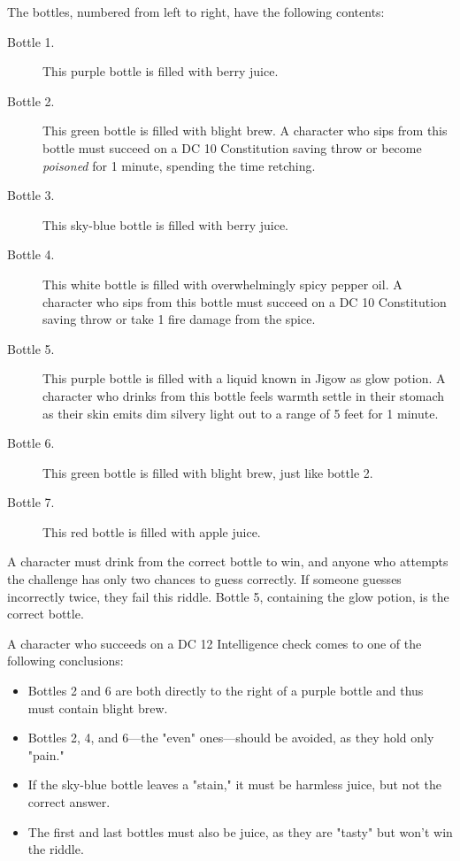 \documentclass[letterpaper, 11pt, bg=full, twocolumn]{dndbook}
\begin{document}
The bottles, numbered from left to right, have the following contents:

\begin{description}
\item[Bottle 1.] This purple bottle is filled with berry juice.
\item[Bottle 2.] This green bottle is filled with blight brew. A character who sips from this bottle must succeed on a DC 10 Constitution saving throw or become \textit{poisoned} for 1 minute, spending the time retching.
\item[Bottle 3.] This sky-blue bottle is filled with berry juice.
\item[Bottle 4.] This white bottle is filled with overwhelmingly spicy pepper oil. A character who sips from this bottle must succeed on a DC 10 Constitution saving throw or take 1 fire damage from the spice.
\item[Bottle 5.] This purple bottle is filled with a liquid known in Jigow as glow potion. A character who drinks from this bottle feels warmth settle in their stomach as their skin emits dim silvery light out to a range of 5 feet for 1 minute.
\item[Bottle 6.] This green bottle is filled with blight brew, just like bottle 2.
\item[Bottle 7.] This red bottle is filled with apple juice.
\end{description}

A character must drink from the correct bottle to win, and anyone who attempts the challenge has only two chances to guess correctly. If someone guesses incorrectly twice, they fail this riddle. Bottle 5, containing the glow potion, is the correct bottle.

A character who succeeds on a DC 12 Intelligence check comes to one of the following conclusions:

\begin{itemize}
\item Bottles 2 and 6 are both directly to the right of a purple bottle and thus must contain blight brew.
\item Bottles 2, 4, and 6---the "even" ones---should be avoided, as they hold only "pain."
\item If the sky-blue bottle leaves a "stain," it must be harmless juice, but not the correct answer.
\item The first and last bottles must also be juice, as they are "tasty" but won't win the riddle.
\end{itemize}
\end{document}
